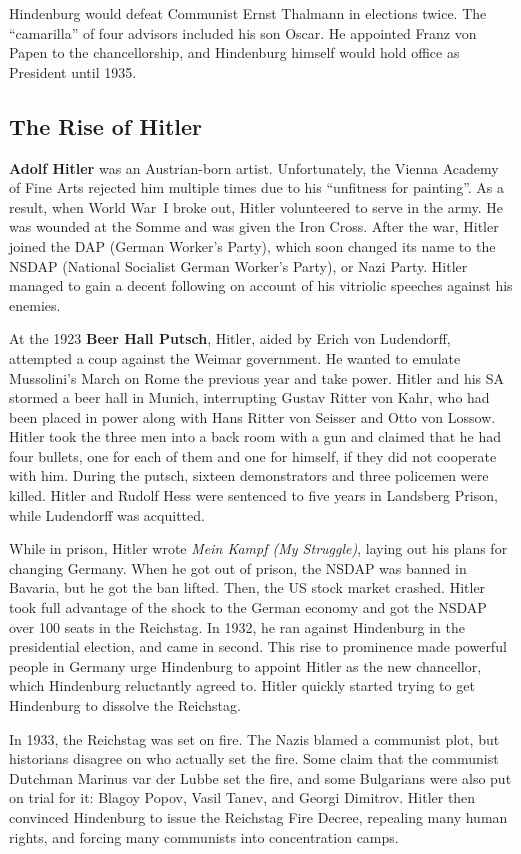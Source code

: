 Hindenburg would defeat Communist Ernst Thalmann in elections twice.
The ``camarilla'' of four advisors included his son Oscar.
He appointed Franz von Papen to the chancellorship,
and Hindenburg himself would hold office as President until 1935.

\subsection*{The Rise of Hitler}

\textbf{Adolf Hitler} was an Austrian-born artist.
Unfortunately,
the Vienna Academy of Fine Arts rejected him multiple times due to his ``unfitness for painting''.
As a result, when World War~I broke out, Hitler volunteered to serve in the army.
He was wounded at the Somme and was given the Iron Cross.
After the war, Hitler joined the DAP (German Worker's Party),
which soon changed its name to the NSDAP (National Socialist German Worker's Party), or Nazi Party.
Hitler managed to gain a decent following on account of his vitriolic speeches against his enemies.

At the 1923 \textbf{Beer Hall Putsch}, Hitler, aided by Erich von Ludendorff,
attempted a coup against the Weimar government.
He wanted to emulate Mussolini's March on Rome the previous year and take power.
Hitler and his SA stormed a beer hall in Munich, interrupting Gustav Ritter von Kahr,
who had been placed in power along with Hans Ritter von Seisser and Otto von Lossow.
Hitler took the three men into a back room with a gun and claimed that he had four bullets,
one for each of them and one for himself, if they did not cooperate with him.
During the putsch, sixteen demonstrators and three policemen were killed.
Hitler and Rudolf Hess were sentenced to five years in Landsberg Prison,
while Ludendorff was acquitted.

While in prison, Hitler wrote \textit{Mein Kampf (My Struggle)},
laying out his plans for changing Germany.
When he got out of prison, the NSDAP was banned in Bavaria, but he got the ban lifted.
Then, the US stock market crashed.
Hitler took full advantage of the shock to the German economy
and got the NSDAP over 100 seats in the Reichstag.
In 1932, he ran against Hindenburg in the presidential election, and came in second.
This rise to prominence made powerful people in Germany
urge Hindenburg to appoint Hitler as the new chancellor,
which Hindenburg reluctantly agreed to.
Hitler quickly started trying to get Hindenburg to dissolve the Reichstag.

In 1933, the Reichstag was set on fire.
The Nazis blamed a communist plot, but historians disagree on who actually set the fire.
Some claim that the communist Dutchman Marinus var der Lubbe set the fire,
and some Bulgarians were also put on trial for it: Blagoy Popov, Vasil Tanev, and Georgi Dimitrov.
Hitler then convinced Hindenburg to issue the Reichstag Fire Decree,
repealing many human rights, and forcing many communists into concentration camps.

